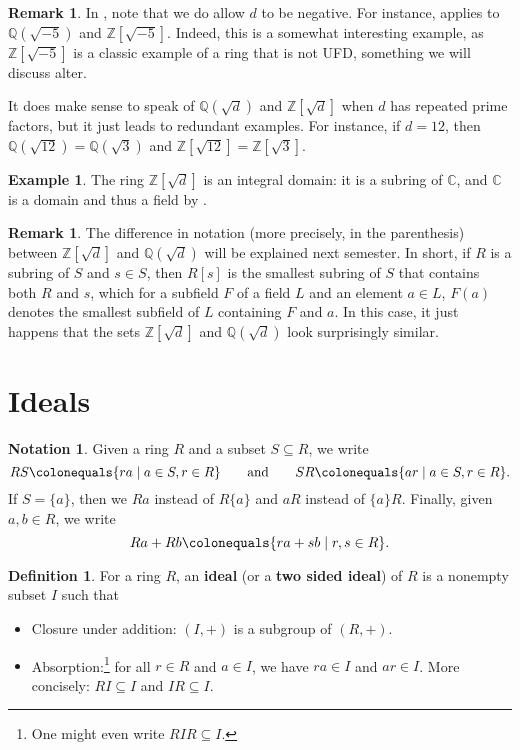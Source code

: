 \documentclass[12pt]{report}
\numberwithin{equation}{section}
\numberwithin{theorem}{chapter}
\theoremstyle{definition}
\newtheorem{definition}[theorem]{Definition}
\newtheorem{example}[theorem]{Example}
\newtheorem*{basic properties}{Basic Properties}
\newtheorem*{Important Remark}{Important Remark}
\newtheorem{remark}[theorem]{Remark}
\newtheorem{notation}[theorem]{Notation}
\newcommand{\df}[1]{{\bf #1}\index{#1}}
\newcommand{\C}{\mathbb{C}}
\begin{document}
\begin{remark}
In , note that we do allow $d$ to be negative. For instance,  applies to $\mathbb{Q}(\sqrt{-5})$ and $\mathbb{Z}[\sqrt{-5}]$. Indeed, this is a somewhat interesting example, as $\mathbb{Z}[\sqrt{-5}]$ is a classic example of a ring that is not UFD, something we will discuss alter.

It does make sense to speak of $\mathbb{Q}(\sqrt{d})$ and $\mathbb{Z}[\sqrt{d}]$ when $d$ has repeated prime factors, but it just leads to redundant examples. For instance, if $d = 12$, then $\mathbb{Q}(\sqrt{12}) = \mathbb{Q}(\sqrt{3})$ and $\mathbb{Z}[\sqrt{12}] = \mathbb{Z}[\sqrt{3}]$.	
\end{remark}

\begin{example} 
 The ring $\mathbb{Z}[\sqrt{d}]$ is an integral domain: it is a subring of $\C$, and $\C$ is a domain and thus a field by .
\end{example}
  

\begin{remark}
	The difference in notation (more precisely, in the parenthesis) between $\mathbb{Z}[\sqrt{d}]$ and $\mathbb{Q}(\sqrt{d})$ will be explained next semester. In short, if $R$ is a subring of $S$ and $s \in S$, then $R[s]$ is the smallest subring of $S$ that contains both $R$ and $s$, which for a subfield $F$ of a field $L$ and an element $a \in L$, $F(a)$ denotes the smallest subfield of $L$ containing $F$ and $a$. In this case, it just happens that the sets $\mathbb{Z}[\sqrt{d}]$ and $\mathbb{Q}(\sqrt{d})$ look surprisingly similar. 
\end{remark}

\section{Ideals}

\begin{notation}
Given a ring $R$ and a subset $S \subseteq R$, we write
	$$RS \colonequals \{ ra \mid a \in S, r \in R \} \qquad \text{and} \qquad SR \colonequals \{ ar \mid a \in S, r \in R \}.$$
If $S = \{ a \}$, then we $Ra$ instead of $R \{ a \}$ and $aR$ instead of $\{ a \}R$. Finally, given $a, b \in R$, we write
$$Ra + R b \colonequals \{ ra + sb \mid r, s \in R \}.$$
\end{notation}


\begin{definition}
For a ring $R$, an \df{ideal} (or a \df{two sided ideal}) of $R$ is a nonempty subset $I$ such that
\begin{itemize}[itemsep=0.1em]
\item Closure under addition: $(I,+)$ is a subgroup of $(R,+)$.
\item Absorption:\footnote{One might even write $RIR \subseteq I$.}
for all $r \in R$ and $a \in I$, we have $ra \in I$ and $ar \in I$. More concisely: $RI\subseteq I$ and $IR\subseteq I$.
\end{itemize}
\end{definition}
\end{document}
